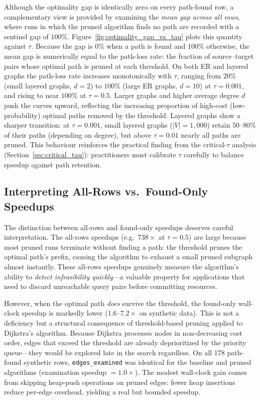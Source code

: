 Although the optimality gap is identically zero on every path-found row, a complementary view is provided by examining the \emph{mean gap across all rows}, where runs in which the pruned algorithm finds no path are recorded with a sentinel gap of $100\%$. Figure~\ref{fig:optimality_gap_vs_tau} plots this quantity against $\tau$. Because the gap is $0\%$ when a path is found and $100\%$ otherwise, the mean gap is numerically equal to the path-loss rate: the fraction of source--target pairs whose optimal path is pruned at each threshold. On both ER and layered graphs the path-loss rate increases monotonically with $\tau$, ranging from $20\%$ (small layered graphs, $d=2$) to $100\%$ (large ER graphs, $d=10$) at $\tau = 0.001$, and rising to near $100\%$ at $\tau = 0.5$. Larger graphs and higher average degree $d$ push the curves upward, reflecting the increasing proportion of high-cost (low-probability) optimal paths removed by the threshold. Layered graphs show a sharper transition: at $\tau = 0.001$, small layered graphs ($|V|=1{,}000$) retain $50$--$80\%$ of their paths (depending on degree), but above $\tau = 0.01$ nearly all paths are pruned. This behaviour reinforces the practical finding from the critical-$\tau$ analysis (Section~\ref{sec:critical_tau}): practitioners must calibrate $\tau$ carefully to balance speedup against path retention.

\subsection{Interpreting All-Rows vs.\ Found-Only Speedups}\label{sec:found_only_analysis}

The distinction between all-rows and found-only speedups deserves careful interpretation. The all-rows speedups (e.g.\ $738\times$ at $\tau=0.5$) are large because most pruned runs terminate without finding a path: the threshold prunes the optimal path's prefix, causing the algorithm to exhaust a small pruned subgraph almost instantly. These all-rows speedups genuinely measure the algorithm's ability to \emph{detect infeasibility quickly}---a valuable property for applications that need to discard unreachable query pairs before committing resources.

However, when the optimal path \emph{does} survive the threshold, the found-only wall-clock speedup is markedly lower ($1.6$--$7.2\times$ on synthetic data). This is not a deficiency but a structural consequence of threshold-based pruning applied to Dijkstra's algorithm. Because Dijkstra processes nodes in non-decreasing cost order, edges that exceed the threshold are already deprioritized by the priority queue---they would be explored late in the search regardless. On all 178 path-found synthetic rows, \texttt{edges\_examined} was identical for the baseline and pruned algorithms (examination speedup $= 1.0\times$). The modest wall-clock gain comes from skipping heap-push operations on pruned edges: fewer heap insertions reduce per-edge overhead, yielding a real but bounded speedup.

